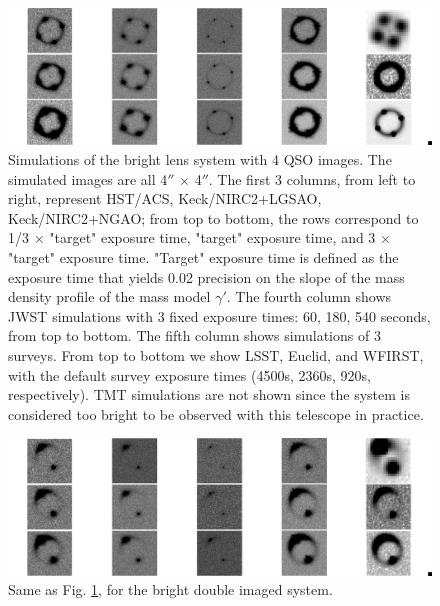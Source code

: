 \documentclass[a4paper,11pt]{article}
\begin{document}
\begin{figure}
\begin{center}
\includegraphics[width=1.0\textwidth]{figures/brighter_system_4QSOimages_all.png}
\end{center}
\caption{Simulations of the bright lens system with 4 QSO images. The simulated images are all 4$''$ $\times$ 4$''$. The first 3 columns, from left to right, represent HST/ACS, Keck/NIRC2+LGSAO, Keck/NIRC2+NGAO; from top to bottom, the rows correspond to 1/3 $\times$ "target" exposure time, "target" exposure time, and 3 $\times$ "target" exposure time. "Target" exposure time is defined as the exposure time that yields 0.02 precision on the slope of the mass density profile of the mass model $\gamma'$. The fourth column shows JWST simulations with 3 fixed exposure times: 60, 180, 540 seconds, from top to bottom. The fifth column
shows simulations of 3 surveys. From top to bottom we show LSST,
Euclid, and WFIRST, with the default survey exposure times (4500s,
2360s, 920s, respectively). TMT simulations are not shown since the
system is considered too bright to be observed with this telescope in
practice.}
\label{fig:brighter_4QSOimages_montage}
\end{figure}


\begin{figure}
\begin{center}
\includegraphics[width=1.0\textwidth]{figures/brighter_system_2QSOimages_all.png}
\end{center}
\caption{Same as Fig. \ref{fig:brighter_4QSOimages_montage}, for the bright double imaged system.}
\label{fig:brighter_2QSOimages_montage}
\end{figure}
\end{document}

